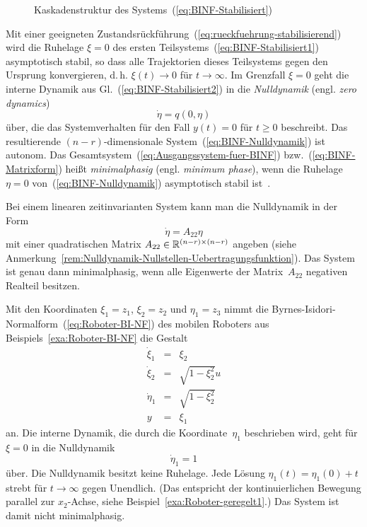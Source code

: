 \begin{figure}
\begin{centering}
\resizebox{0.7\textwidth}{!}{}
\par\end{centering}
\caption{Kaskadenstruktur des Systems~(\ref{eq:BINF-Stabilisiert}) \label{fig:Kaskadenstruktur-EA-Linearisierung}}
\end{figure}

Mit einer geeigneten Zustandsrückführung~(\ref{eq:rueckfuehrung-stabilisierend})
wird die Ruhelage $\xi=0$ des ersten Teilsystems~(\ref{eq:BINF-Stabilisiert1})
asymptotisch stabil, so dass alle Trajektorien dieses Teilsystems
gegen den Ursprung konvergieren, d.\,h. $\xi(t)\to0$ für $t\to\infty$.
Im Grenzfall $\xi=0$ geht die interne Dynamik aus Gl.~(\ref{eq:BINF-Stabilisiert2})
in die \emph{Nulldynamik} (engl. \emph{zero dynamics})
\begin{equation}
\dot{\eta}=q(0,\eta)\label{eq:BINF-Nulldynamik}
\end{equation}
über, die das Systemverhalten für den Fall $y(t)=0$ für $t\geq0$
beschreibt. Das resultierende $(n-r)$-dimensionale System~(\ref{eq:BINF-Nulldynamik})
ist autonom. Das Gesamtsystem~(\ref{eq:Ausgangssystem-fuer-BINF})
bzw.~(\ref{eq:BINF-Matrixform}) heißt \emph{minimalphasig}
(engl. \emph{minimum phase}), wenn die Ruhelage $\eta=0$ von~(\ref{eq:BINF-Nulldynamik})
asymptotisch stabil ist~\cite{byrnes88,byrnes91nf,byrnes91passive,svaricek2006,zeitz2014}.
\begin{remark}
\label{rem:Nulldynamik-linear}Bei einem linearen zeitinvarianten
System kann man die Nulldynamik in der Form
\[
\dot{\eta}=A_{22}\eta
\]
mit einer quadratischen Matrix $A_{22}\in{\mathbb{R}}^{(n-r)\times(n-r)}$ angeben
(siehe Anmerkung~\ref{rem:Nulldynamik-Nullstellen-Uebertragungsfunktion}).
Das System ist genau dann minimalphasig, wenn alle Eigenwerte der
Matrix~$A_{22}$ negativen Realteil besitzen.
\end{remark}

\begin{example}
\label{exa:mobiler-roboter-nulldynamik1}Mit den Koordinaten $\xi_{1}=z_{1}$,
$\xi_{2}=z_{2}$ und $\eta_{1}=z_{3}$ nimmt die Byrnes-Isidori-Normalform~(\ref{eq:Roboter-BI-NF})
des mobilen Roboters aus Beispiels~\ref{exa:Roboter-BI-NF} die Gestalt
\[
\begin{array}{lcl}
\dot{\xi}_{1} & = & \xi_{2}\\
\dot{\xi}_{2} & = & \sqrt{1-\xi_{2}^{2}}u\\
\dot{\eta}_{1} & = & \sqrt{1-\xi_{2}^{2}}\\
y & = & \xi_{1}
\end{array}
\]
an. Die interne Dynamik, die durch die Koordinate~$\eta_{1}$ beschrieben
wird, geht für $\xi=0$ in die Nulldynamik 
\[
\dot{\eta}_{1}=1
\]
über. Die Nulldynamik besitzt keine Ruhelage. Jede Lösung $\eta_{1}(t)=\eta_{1}(0)+t$
strebt für $t\to\infty$ gegen Unendlich. (Das entspricht der kontinuierlichen
Bewegung parallel zur $x_{2}$-Achse, siehe Beispiel~\ref{exa:Roboter-geregelt1}.)
Das System ist damit nicht minimalphasig.
\end{example}


